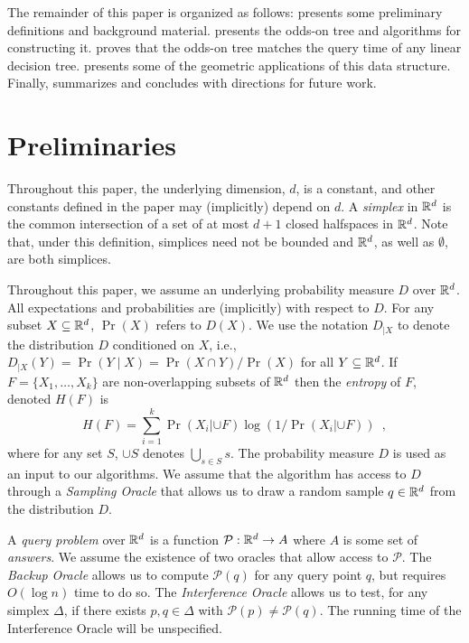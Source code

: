 \documentclass{patmorin}
\begin{document}
The remainder of this paper is organized as follows:
 presents some preliminary definitions and background
material.  presents the odds-on tree and
algorithms for constructing it.   proves that the
odds-on tree matches the query time of any linear decision tree.
 presents some of the geometric applications of this
data structure. Finally,  summarizes and concludes
with directions for future work.

\section{Preliminaries}

Throughout this paper, the underlying dimension, $d$, is a constant, and
other constants defined in the paper may (implicitly) depend on $d$.
A \emph{simplex} in $\mathbb{R}^d$ is the common intersection of a set of at most
$d+1$ closed halfspaces in $\mathbb{R}^d$. Note that, under this definition,
simplices need not be bounded and $\mathbb{R}^d$, as well as $\emptyset$, are
both simplices.


Throughout this paper, we assume an underlying probability measure
$D$ over $\mathbb{R}^d$.  All expectations and probabilities are (implicitly)
with respect to $D$.  For any subset $X\subseteq\mathbb{R}^d$, $\Pr(X)$ refers
to $D(X)$.  We use the notation $D_{|X}$ to denote the distribution $D$
conditioned on $X$, i.e., $D_{|X}(Y)=\Pr(Y\mid X)=\Pr(X\cap Y)/\Pr(X)$
for all $Y\subseteq\mathbb{R}^d$.  If $F=\{X_1,\ldots,X_k\}$ are non-overlapping
subsets of $\mathbb{R}^d$ then the \emph{entropy} of $F$, denoted $H(F)$ is
\[
    H(F) = \sum_{i=1}^k \Pr(X_i|{\cup F})\log(1/\Pr(X_i|{\cup F})) \enspace ,
\]
where for any set $S$, $\cup S$ denotes $\bigcup_{s\in S} s$.
The probability measure $D$ is used as an input to our algorithms.
We assume that the algorithm has access to $D$ through a \emph{Sampling
Oracle} that allows us to draw a random sample $q\in\mathbb{R}^d$ from the
distribution $D$.

A \emph{query problem} over $\mathbb{R}^d$ is a function
$\mathcal{P}:\mathbb{R}^d\rightarrow A$ where $A$ is some set of \emph{answers}.
We assume the existence of two oracles that allow access to $\mathcal{P}$.
The \emph{Backup Oracle} allows us to compute $\mathcal{P}(q)$ for
any query point $q$, but requires $O(\log n)$ time to do so.  The
\emph{Interference Oracle} allows us to test, for any simplex $\Delta$,
if there exists $p,q\in\Delta$ with $\mathcal{P}(p)\neq\mathcal{P}(q)$.
The running time of the Interference Oracle will be unspecified.
\end{document}
